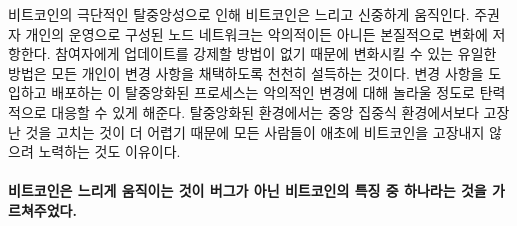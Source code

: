 	
\begin{comment}
	The radically decentralized nature of Bitcoin is what makes it move
	slowly and deliberately. A network of nodes, each run by a sovereign
	individual, is inherently resistant to change --- malicious or not. With
	no way to force updates upon users the only way to introduce changes is
	by slowly convincing each and every one of those individuals to adopt a
	change. This non-central process of introducing and deploying changes is
	what makes the network incredibly resilient to malicious changes. It is
	also what makes fixing broken things more difficult than in a
	centralized environment, which is why everyone tries not to break things
	in the first place.
\end{comment}
비트코인의 극단적인 탈중앙성으로 인해 비트코인은 느리고 신중하게 움직인다.
주권자 개인의 운영으로 구성된 노드 네트워크는 악의적이든 아니든 본질적으로 변화에 저항한다.
참여자에게 업데이트를 강제할 방법이 없기 때문에 변화시킬 수 있는 유일한 방법은
모든 개인이 변경 사항을 채택하도록 천천히 설득하는 것이다.
변경 사항을 도입하고 배포하는 이 탈중앙화된 프로세스는 악의적인 변경에 대해 놀라울 정도로 탄력적으로 대응할 수 있게 해준다.
탈중앙화된 환경에서는 중앙 집중식 환경에서보다 고장난 것을 고치는 것이 더 어렵기 때문에 모든 사람들이 애초에 비트코인을 고장내지 않으려 노력하는 것도 이유이다. 
	
\paragraph{비트코인은 느리게 움직이는 것이 버그가 아닌 비트코인의 특징 중 하나라는 것을 가르쳐주었다.}

%
%
%
%
%
%
%
